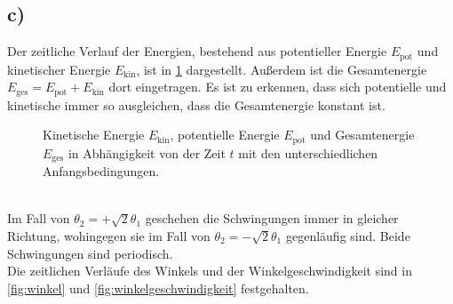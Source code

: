 \subsection*{c)}
Der zeitliche Verlauf der Energien, bestehend aus potentieller Energie $E_\text{pot}$ und kinetischer Energie $E_\text{kin}$, ist in \cref{fig:Energie} dargestellt.
Außerdem ist die Gesamtenergie $E_\text{ges}=E_\text{pot}+E_\text{kin}$ dort eingetragen.
Es ist zu erkennen, dass sich potentielle und kinetische immer so ausgleichen, dass die Gesamtenergie konstant ist.
\begin{figure}[h!]
	\caption{Kinetische Energie $E_\text{kin}$, potentielle Energie $E_\text{pot}$ und Gesamtenergie $E_\text{ges}$ in Abhängigkeit von der Zeit $t$ mit den unterschiedlichen Anfangsbedingungen.\label{fig:Energie}}
\end{figure}\\
Im Fall von $\theta_2=+\sqrt{2}\theta_1$ geschehen die Schwingungen immer in gleicher Richtung, wohingegen sie im Fall von $\theta_2=-\sqrt{2}\theta_1$ gegenläufig sind.
Beide Schwingungen sind periodisch.\\
Die zeitlichen Verläufe des Winkels und der Winkelgeschwindigkeit sind in \cref{fig:winkel} und \cref{fig:winkelgeschwindigkeit} festgehalten.
